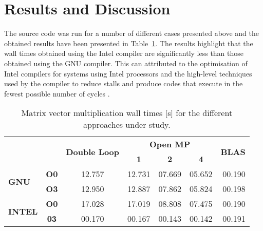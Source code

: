 \documentclass[11pt, oneside]{article}   	%
\begin{document}
\section{Results and Discussion}
The source code was run for a number of different cases presented above and the obtained results have been presented in Table~\ref{tab:times}. The results highlight that the wall times obtained using the Intel compiler are significantly less than those obtained using the  GNU compiler. This can attributed to the optimisation of Intel compilers for systems using Intel processors and the high-level techniques used by the compiler to reduce stalls and produce codes that execute in the fewest possible number of cycles \cite{Corporation:2018aa}.
\begin{table}[htp]
\caption{Matrix vector multiplication wall times [s] for the different approaches under study.}
\label{tab:times}
\centering
\begin{tabular}{@{}lcccccr@{}}
\toprule
                                & \multicolumn{1}{l}{} & \multirow{2}{*}{\textbf{Double Loop}} & \multicolumn{3}{c}{\textbf{Open MP}} & \multicolumn{1}{c}{\multirow{2}{*}{\textbf{BLAS}}} \\ \cmidrule(lr){4-6}
                                & \multicolumn{1}{l}{} &                                       & \textbf{1} & \textbf{2} & \textbf{4} & \multicolumn{1}{c}{}                               \\ \midrule
\multirow{2}{*}{\textbf{GNU}}   & \textbf{O0}          & 12.757                                & 12.731     & 07.669     & 05.652     & 00.190                                             \\
                                & \textbf{O3}          & 12.950                                & 12.887     & 07.862     & 05.824     & 00.198                                             \\
\multirow{2}{*}{\textbf{INTEL}} & \textbf{O0}          & 17.028                                & 17.019     & 08.808     & 07.475     & 00.190                                             \\
                                & \textbf{03}          & 00.170                                & 00.167     & 00.143     & 00.142     & 00.191                                             \\ \bottomrule
\end{tabular}
\end{table}
\end{document}
